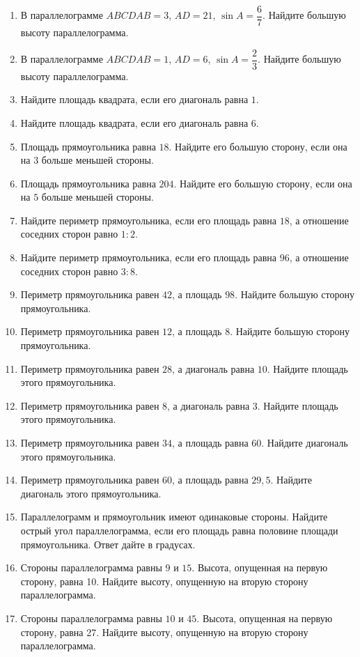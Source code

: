 \documentclass[12pt, a4paper]{article}
\begin{document}
	\begin{enumerate}
		\item В параллелограмме \(ABCD AB=3\), \(AD=21\),  \( \sin A=\dfrac{6}{7} \).  Найдите большую высоту параллелограмма.
		\item В параллелограмме \(ABCD AB=1\), \(AD=6\),  \( \sin A=\dfrac{2}{3} \).  Найдите большую высоту параллелограмма.
		\item Найдите площадь квадрата, если его диагональ равна \( 1 \).
		\item Найдите площадь квадрата, если его диагональ равна \( 6 \).
		\item Площадь прямоугольника равна \( 18 \). Найдите его большую сторону, если она на \( 3 \) больше меньшей стороны.
		\item Площадь прямоугольника равна \( 204 \). Найдите его большую сторону, если она на \( 5 \) больше меньшей стороны.
		\item Найдите периметр прямоугольника, если его площадь равна \( 18 \), а отношение соседних сторон равно \( 1:2 \).
		\item Найдите периметр прямоугольника, если его площадь равна \( 96 \), а отношение соседних сторон равно \( 3:8 \).
		\item Периметр прямоугольника равен \( 42 \), а площадь \( 98 \). Найдите большую сторону прямоугольника.
		\item Периметр прямоугольника равен \( 12 \), а площадь \( 8 \). Найдите большую сторону прямоугольника.
		\item Периметр прямоугольника равен \( 28 \), а диагональ равна \( 10 \). Найдите площадь этого прямоугольника.
		\item Периметр прямоугольника равен \( 8 \), а диагональ равна \( 3 \). Найдите площадь этого прямоугольника.
		\item Периметр прямоугольника равен \( 34 \), а площадь равна \( 60 \). Найдите диагональ этого прямоугольника.
		\item Периметр прямоугольника равен \( 60 \), а площадь равна \( 29,5 \). Найдите диагональ этого прямоугольника.
		\item Параллелограмм и прямоугольник имеют одинаковые стороны. Найдите острый угол параллелограмма, если его площадь равна половине площади прямоугольника. Ответ дайте в градусах.
		\item Стороны параллелограмма равны \( 9 \) и \( 15 \). Высота, опущенная на первую сторону, равна 10. Найдите высоту, опущенную на вторую сторону параллелограмма.
		\item Стороны параллелограмма равны \( 10 \) и \( 45 \). Высота, опущенная на первую сторону, равна 27. Найдите высоту, опущенную на вторую сторону параллелограмма.

\end{enumerate}
\end{document}
